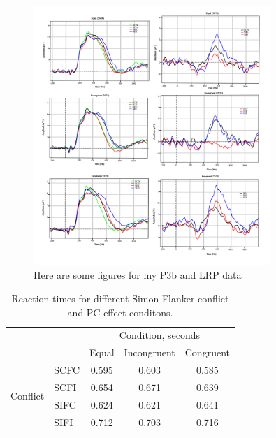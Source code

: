 \begin{figure}[htbp] 
\centering
\includegraphics[width=0.8\textwidth]{totalfigs_copy}
\caption{Here are some figures for my P3b and LRP data}
\label{fig:ERPs}
\end{figure}

\begin{table}[h!]
\centering
\caption{\label{tab:RTmeans}Reaction times for different Simon-Flanker conflict and PC effect conditons.}
\begin{tabular}{l l c c c}
 \toprule
                          &              & \multicolumn{3}{c}{Condition, seconds}\\
  \cmidrule{3-5}
                          &              & {Equal}           & {Incongruent}           & {Congruent}\\
  \cmidrule{3-5}
  \multirow{ 4}{*}{Conflict} & SCFC &     0.595    &      0.603     &      0.585     \\
                          & SCFI      &     0.654      &      0.671     &      0.639   \\
                          & SIFC     &     0.624     &     0.621     &     0.641     \\
                          & SIFI     &      0.712    &     0.703     &     0.716    \\
  \bottomrule
 \end{tabular}
\end{table}
